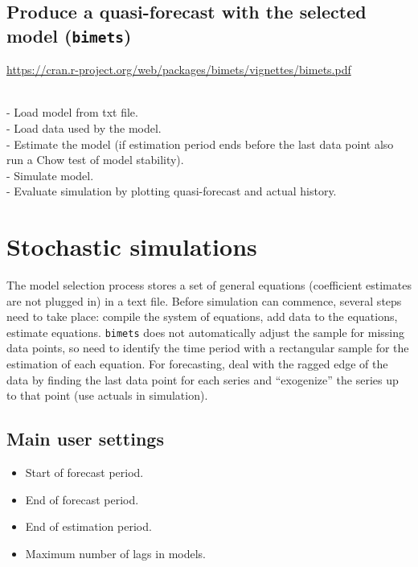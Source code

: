 \documentclass[
  letterpaper,
  DIV=11,
  numbers=noendperiod]{scrreport}
\providecommand{\tightlist}{%
  \setlength{\itemsep}{0pt}\setlength{\parskip}{0pt}}\usepackage{longtable,booktabs,array}
\begin{document}
\hypertarget{produce-a-quasi-forecast-with-the-selected-model-bimets}{%
\section{\texorpdfstring{Produce a quasi-forecast with the selected
model
(\texttt{bimets})}{Produce a quasi-forecast with the selected model (bimets)}}\label{produce-a-quasi-forecast-with-the-selected-model-bimets}}

\url{https://cran.r-project.org/web/packages/bimets/vignettes/bimets.pdf}\strut \\
- Load model from txt file.\\
- Load data used by the model.\\
- Estimate the model (if estimation period ends before the last data
point also run a Chow test of model stability).\\
- Simulate model.\\
- Evaluate simulation by plotting quasi-forecast and actual history.


\hypertarget{stochastic-simulations}{%
\chapter{Stochastic simulations}\label{stochastic-simulations}}

The model selection process stores a set of general equations
(coefficient estimates are not plugged in) in a text file. Before
simulation can commence, several steps need to take place: compile the
system of equations, add data to the equations, estimate equations.
\texttt{bimets} does not automatically adjust the sample for missing
data points, so need to identify the time period with a rectangular
sample for the estimation of each equation. For forecasting, deal with
the ragged edge of the data by finding the last data point for each
series and ``exogenize'' the series up to that point (use actuals in
simulation).

\hypertarget{main-user-settings-1}{%
\section{Main user settings}\label{main-user-settings-1}}

\begin{itemize}
\tightlist
\item
  Start of forecast period.\\
\item
  End of forecast period.\\
\item
  End of estimation period.\\
\item
  Maximum number of lags in models.
\end{itemize}
\end{document}
